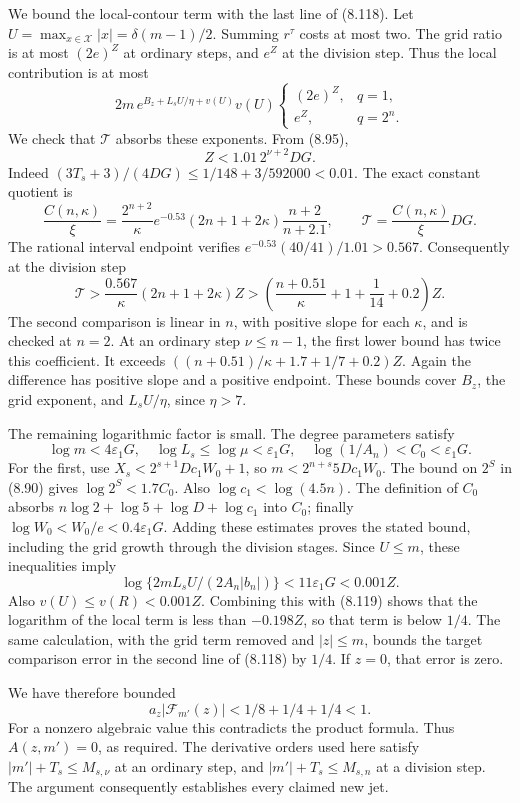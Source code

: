\documentclass[
  11pt,
  a4paper,
]{article}
\begin{document}
We bound the local-contour term with the last line of (8.118). Let
\(U=\max_{x\in\mathcal X}|x|=\delta(m-1)/2\). Summing \(r^\tau\) costs
at most two. The grid ratio is at most \((2e)^Z\) at ordinary steps, and
\(e^Z\) at the division step. Thus the local contribution is at most \[
2m\,e^{B_z+L_sU/\eta+v(U)}v(U)
\begin{cases}
(2e)^Z,&q=1,\\
e^Z,&q=2^n.
\end{cases}
\] We check that \(\mathcal T\) absorbs these exponents. From (8.95), \[
Z<1.01\,2^{\nu+2}DG.
\] Indeed \((3T_s+3)/(4DG)\le1/148+3/592000<0.01\). The exact constant
quotient is \[
\frac{C(n,\kappa)}{\xi}
=\frac{2^{n+2}}{\kappa}e^{-0.53}
(2n+1+2\kappa)\frac{n+2}{n+2.1},
\qquad \mathcal T=\frac{C(n,\kappa)}{\xi}DG.
\] The rational interval endpoint verifies
\(e^{-0.53}(40/41)/1.01>0.567\). Consequently at the division step \[
\mathcal T>
\frac{0.567}{\kappa}(2n+1+2\kappa)Z
>
\left(\frac{n+0.51}{\kappa}+1+\frac1{14}+0.2\right)Z.
\tag{8.119}
\] The second comparison is linear in \(n\), with positive slope for
each \(\kappa\), and is checked at \(n=2\). At an ordinary step
\(\nu\le n-1\), the first lower bound has twice this coefficient. It
exceeds \(((n+0.51)/\kappa+1.7+1/7+0.2)Z\). Again the difference has
positive slope and a positive endpoint. These bounds cover \(B_z\), the
grid exponent, and \(L_sU/\eta\), since \(\eta>7\).

The remaining logarithmic factor is small. The degree parameters satisfy
\[
\log m<4\varepsilon_1G,\quad
\log L_s\le\log\mu<\varepsilon_1G,\quad
\log(1/A_n)<C_0<\varepsilon_1G.
\] For the first, use \(X_s<2^{s+1}Dc_1W_0+1\), so
\(m<2^{n+s}5Dc_1W_0\). The bound on \(2^S\) in (8.90) gives
\(\log2^S<1.7C_0\). Also \(\log c_1<\log(4.5n)\). The definition of
\(C_0\) absorbs \(n\log2+\log5+\log D+\log c_1\) into \(C_0\); finally
\(\log W_0<W_0/e<0.4\varepsilon_1G\). Adding these estimates proves the
stated bound, including the grid growth through the division stages.
Since \(U\le m\), these inequalities imply \[
\log\{2mL_sU/(2A_n|b_n|)\}<11\varepsilon_1G<0.001Z.
\] Also \(v(U)\le v(R)<0.001Z\). Combining this with (8.119) shows that
the logarithm of the local term is less than \(-0.198Z\), so that term
is below \(1/4\). The same calculation, with the grid term removed and
\(|z|\le m\), bounds the target comparison error in the second line of
(8.118) by \(1/4\). If \(z=0\), that error is zero.

We have therefore bounded \[
a_z|\mathcal F_{m'}(z)|
<1/8+1/4+1/4<1.
\] For a nonzero algebraic value this contradicts the product formula.
Thus \(A(z,m')=0\), as required. The derivative orders used here satisfy
\(|m'|+T_s\le M_{s,\nu}\) at an ordinary step, and
\(|m'|+T_s\le M_{s,n}\) at a division step. The argument consequently
establishes every claimed new jet.
\end{document}
